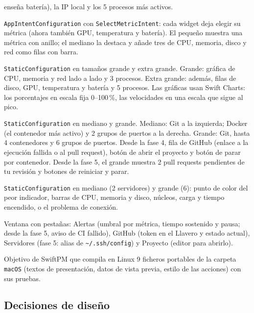 \documentclass[11pt,a4paper]{article}
\begin{document}
\begin{description}
    enseña batería), la IP local y los 5 procesos más activos.
  \item[Widget de métrica] \texttt{AppIntentConfiguration} con
    \texttt{SelectMetricIntent}: cada widget deja elegir su métrica
    (ahora también GPU, temperatura y batería). El pequeño muestra una
    métrica con anillo; el mediano la destaca y añade tres de CPU,
    memoria, disco y red como filas con barra.
  \item[Widget panel (nuevo)] \texttt{StaticConfiguration} en tamaños
    grande y extra grande. Grande: gráfica de CPU, memoria y red lado
    a lado y 3 procesos. Extra grande: además, filas de disco, GPU,
    temperatura y batería y 5 procesos. Las gráficas usan Swift
    Charts: los porcentajes en escala fija 0--100\,\%, las
    velocidades en una escala que sigue al pico.
  \item[Widget de contexto (fase 3)] \texttt{StaticConfiguration} en
    mediano y grande. Mediano: Git a la izquierda; Docker (el
    contenedor más activo) y 2 grupos de puertos a la derecha.
    Grande: Git, hasta 4 contenedores y 6 grupos de puertos. Desde la
    fase 4, fila de GitHub (enlace a la ejecución fallida o al pull
    request), botón de abrir el proyecto y botón de parar por
    contenedor. Desde la fase 5, el grande muestra 2 pull requests
    pendientes de tu revisión y botones de reiniciar y parar.
  \item[Widget de servidores (fase 5)] \texttt{StaticConfiguration}
    en mediano (2 servidores) y grande (6): punto de color del peor
    indicador, barras de CPU, memoria y disco, núcleos, carga y tiempo
    encendido, o el problema de conexión.
  \item[Ajustes (fase 4)] Ventana con pestañas: Alertas
    (umbral por métrica, tiempo sostenido y pausa; desde la fase 5,
    aviso de CI fallido), GitHub (token en el Llavero y estado actual),
    Servidores (fase 5: alias de \texttt{\textasciitilde/.ssh/config}) y
    Proyecto (editor para abrirlo).
  \item[\texttt{DevWidgetsPresentation} (fase 4)] Objetivo de
    SwiftPM que compila en Linux 9 ficheros portables de la carpeta
    \texttt{macOS} (textos de presentación, datos de vista previa,
    estilo de las acciones) con sus pruebas.
\end{description}

\subsection{Decisiones de diseño}
\end{document}
